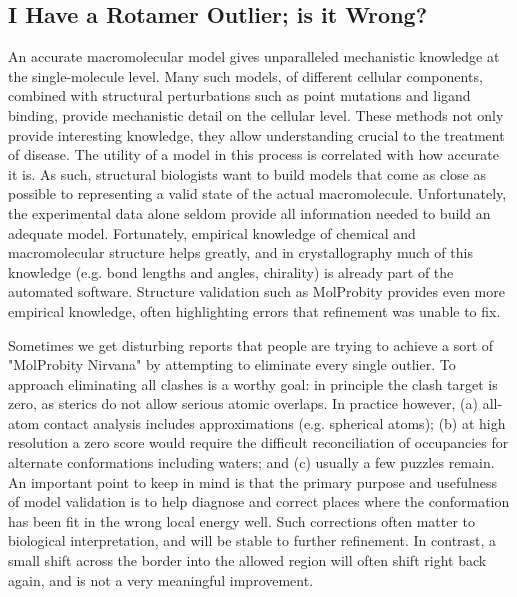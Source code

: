\subsection{I Have a Rotamer Outlier; is it Wrong?}
An accurate macromolecular model gives unparalleled mechanistic knowledge at the single-molecule level. Many such models, of different cellular components, combined with structural perturbations such as point mutations and ligand binding, provide mechanistic detail on the cellular level. These methods not only provide interesting knowledge, they allow understanding crucial to the treatment of disease. The utility of a model in this process is correlated with how accurate it is. As such, structural biologists want to build models that come as close as possible to representing a valid state of the actual macromolecule. Unfortunately, the experimental data alone seldom provide all information needed to build an adequate model. Fortunately, empirical knowledge of chemical and macromolecular structure helps greatly, and in crystallography much of this knowledge (e.g. bond lengths and angles, chirality) is already part of the automated software. Structure validation such as MolProbity provides even more empirical knowledge, often highlighting errors that refinement was unable to fix.

Sometimes we get disturbing reports that people are trying to achieve a sort of "MolProbity Nirvana" by attempting to eliminate every single outlier. To approach eliminating all clashes is a worthy goal: in principle the clash target is zero, as sterics do not allow serious atomic overlaps. In practice however, (a) all-atom contact analysis includes approximations (e.g. spherical atoms); (b) at high resolution a zero score would require the difficult reconciliation of occupancies for alternate conformations including waters; and (c) usually a few puzzles remain. An important point to keep in mind is that the primary purpose and usefulness of model validation is to help diagnose and correct places where the conformation has been fit in the wrong local energy well. Such corrections often matter to biological interpretation, and will be stable to further refinement. In contrast, a small shift across the border into the allowed region will often shift right back again, and is not a very meaningful improvement.

